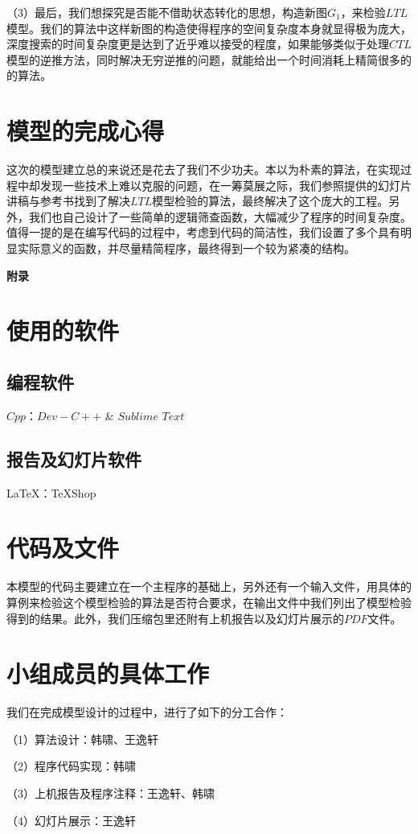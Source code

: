 \documentclass[UTF8]{ctexart}
\begin{document}
（3）最后，我们想探究是否能不借助状态转化的思想，构造新图$G_{1}$，来检验$LTL$模型。我们的算法中这样新图的构造使得程序的空间复杂度本身就显得极为庞大，深度搜索的时间复杂度更是达到了近乎难以接受的程度，如果能够类似于处理$CTL$模型的逆推方法，同时解决无穷逆推的问题，就能给出一个时间消耗上精简很多的的算法。

\section{模型的完成心得}
这次的模型建立总的来说还是花去了我们不少功夫。本以为朴素的算法，在实现过程中却发现一些技术上难以克服的问题，在一筹莫展之际，我们参照提供的幻灯片讲稿与参考书找到了解决$LTL$模型检验的算法，最终解决了这个庞大的工程。另外，我们也自己设计了一些简单的逻辑筛查函数，大幅减少了程序的时间复杂度。值得一提的是在编写代码的过程中，考虑到代码的简洁性，我们设置了多个具有明显实际意义的函数，并尽量精简程序，最终得到一个较为紧凑的结构。

\newpage
\begin{center}
  \bf{\LARGE 附录}
\end{center}
\appendix
\renewcommand{\appendixname}{Appendix~\Alph{section}}
\section{使用的软件}
\subsection{编程软件}
$Cpp$：$Dev-C++$   \&  $Sublime$  $Text$                  

\subsection{报告及幻灯片软件}
\LaTeX：\TeX Shop

\section{代码及文件}
本模型的代码主要建立在一个主程序的基础上，另外还有一个输入文件，用具体的算例来检验这个模型检验的算法是否符合要求，在输出文件中我们列出了模型检验得到的结果。此外，我们压缩包里还附有上机报告以及幻灯片展示的$PDF$文件。

\section{小组成员的具体工作}
我们在完成模型设计的过程中，进行了如下的分工合作：

（1）算法设计：韩啸、王逸轩

（2）程序代码实现：韩啸

（3）上机报告及程序注释：王逸轩、韩啸

（4）幻灯片展示：王逸轩

	
\end{document}
